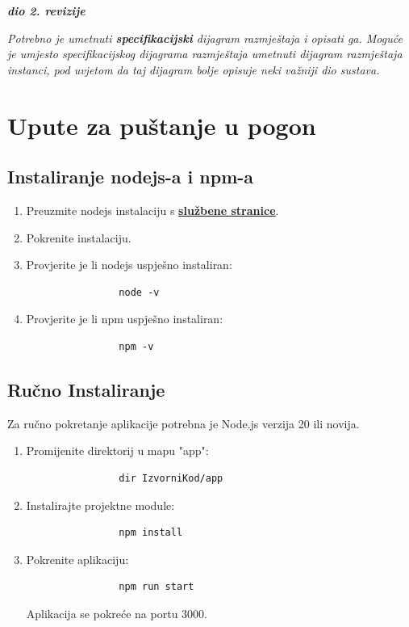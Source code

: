 			\textbf{\textit{dio 2. revizije}}
			
			 \textit{Potrebno je umetnuti \textbf{specifikacijski} dijagram razmještaja i opisati ga. Moguće je umjesto specifikacijskog dijagrama razmještaja umetnuti dijagram razmještaja instanci, pod uvjetom da taj dijagram bolje opisuje neki važniji dio sustava.}
			
			\eject 
		
		\section{Upute za puštanje u pogon}
		
		\subsection*{Instaliranje nodejs-a i npm-a}
		\begin{enumerate}
			\item Preuzmite nodejs instalaciju s \textbf{\href{https://nodejs.org/en/download/}{službene stranice}}.
			\item Pokrenite instalaciju.
			\item Provjerite je li nodejs uspješno instaliran:
			\begin{verbatim}
				node -v
			\end{verbatim}
			\item Provjerite je li npm uspješno instaliran:
			\begin{verbatim}
				npm -v
			\end{verbatim}
		\end{enumerate}

		\subsection*{Ručno Instaliranje}
		Za ručno pokretanje aplikacije potrebna je Node.js verzija 20 ili novija.
		\begin{enumerate}
			\item Promijenite direktorij u mapu "app":
			\begin{verbatim}
				dir IzvorniKod/app 
			\end{verbatim}
			\item Instalirajte projektne module:
			\begin{verbatim}
				npm install
			\end{verbatim}
			\item Pokrenite aplikaciju:
			\begin{verbatim}
				npm run start
			\end{verbatim}
			Aplikacija se pokreće na portu 3000.
		\end{enumerate}
		

